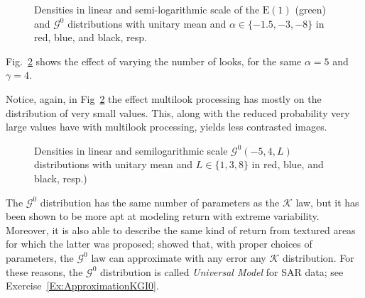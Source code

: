 \begin{figure}[hbt]
\centering
{}
\caption[Densities in linear and semi-logarithmic scale of the $\text{E}(1)$ (green) and $\mathcal G^0$ distributions with unitary mean]{Densities in linear and semi-logarithmic scale of the $\text{E}(1)$ (green) and $\mathcal G^0$ distributions with unitary mean and $\alpha\in\{-1.5,-3,-8\}$ in red, blue, and black, resp.}\label{Fig:GI0Distribution}
\end{figure}

Fig.~\ref{Fig:GI0DistributionLooks} shows the effect of varying the number of looks, for the same $\alpha=5$ and $\gamma=4$.

Notice, again, in Fig~\ref{Fig:GI0DistributionLooks} the effect multilook processing has mostly on the distribution of very small values.
This, along with the reduced probability very large values have with multilook processing, yields less contrasted images.

\begin{figure}[hbt]
\centering
{}
\caption[Densities in linear and semilogarithmic scale $\mathcal G^0(-5,4,L)$ distributions with unitary mean and $L\in\{1,3,8\}$]{Densities in linear and semilogarithmic scale $\mathcal G^0(-5,4,L)$ distributions with unitary mean and $L\in\{1,3,8\}$ in red, blue, and black, resp.)}\label{Fig:GI0DistributionLooks}
\end{figure}

The $\mathcal{G}^0$ distribution has the same number of parameters as the $\mathcal{K}$ law, but it has been shown to be more apt at modeling return with extreme variability.
Moreover, it is also able to describe the same kind of return from textured areas for which the latter was proposed; \citet{MejailJacoboFreryBustos:IJRS} showed that, with proper choices of parameters, the $\mathcal G^0$ law can approximate with any error any $\mathcal K$ distribution.
For these reasons, the $\mathcal G^0$ distribution is called \textit{Universal Model} for SAR data; see Exercise~\ref{Ex:ApproximationKGI0}.

